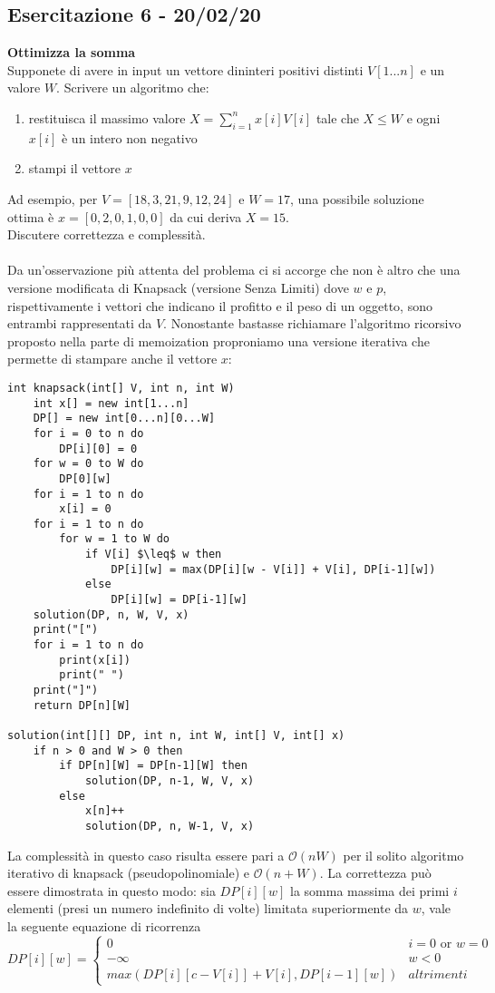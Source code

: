 \documentclass[../cheatSheetAlgoritmi.tex]{subfiles}
\begin{document}
\subsection{Esercitazione 6 - 20/02/20}
\textbf{Ottimizza la somma}\\
Supponete di avere in input un vettore dininteri positivi distinti $V[1. . . n]$ e un valore $W$. Scrivere un algoritmo che:
\begin{enumerate}
	\item restituisca il massimo valore $X =  \sum_{i = 1}^{n} x[i] V[i]$ tale che $X \leq W$ e ogni $x[i]$ è un intero non negativo
	\item stampi il vettore $x$
\end{enumerate}
Ad esempio, per $V = [18,3,21,9,12,24]$ e $W = 17$, una possibile soluzione ottima è $x = [0,2,0,1,0,0]$ da cui deriva $X= 15$.\\
Discutere correttezza e complessità.\\\\
Da un'osservazione più attenta del problema ci si accorge che non è altro che una versione modificata di Knapsack (versione Senza Limiti) dove $w$ e $p$, rispettivamente i vettori che indicano il profitto e il peso di un oggetto, sono entrambi rappresentati da $V$. Nonostante bastasse richiamare l'algoritmo ricorsivo proposto nella parte di memoization proproniamo una versione iterativa che permette di stampare anche il vettore $x$:\\
\begin{lstlisting}[caption=Ottimizza la Somma]
int knapsack(int[] V, int n, int W)
	int x[] = new int[1...n]
	DP[] = new int[0...n][0...W]
	for i = 0 to n do
		DP[i][0] = 0
	for w = 0 to W do
		DP[0][w]
	for i = 1 to n do
		x[i] = 0
	for i = 1 to n do
		for w = 1 to W do
			if V[i] $\leq$ w then
				DP[i][w] = max(DP[i][w - V[i]] + V[i], DP[i-1][w])
			else
				DP[i][w] = DP[i-1][w]
	solution(DP, n, W, V, x)
	print("[")
	for i = 1 to n do
		print(x[i])
		print(" ")
	print("]")
	return DP[n][W]
	
solution(int[][] DP, int n, int W, int[] V, int[] x)
	if n > 0 and W > 0 then
		if DP[n][W] = DP[n-1][W] then
			solution(DP, n-1, W, V, x)
		else
			x[n]++
			solution(DP, n, W-1, V, x)
\end{lstlisting}
La complessità in questo caso risulta essere pari a $\mathcal{O}(nW)$ per il solito algoritmo iterativo di knapsack (pseudopolinomiale) e $\mathcal{O}(n + W)$. La correttezza può essere dimostrata in questo modo: sia $DP[i][w]$ la somma massima dei primi $i$ elementi (presi un numero indefinito di volte) limitata superiormente da $w$, vale la seguente equazione di ricorrenza
\begin{equation*}
  	DP[i][w] =\begin{cases}
    	0 & \text{$i = 0$  or  $w = 0$}\\
    	-\infty & \text{$w < 0$}\\
    	max(DP[i][c-V[i]]+V[i], DP[i-1][w]) & \text{$altrimenti$}
  	\end{cases}
\end{equation*} \\\\
\end{document}
